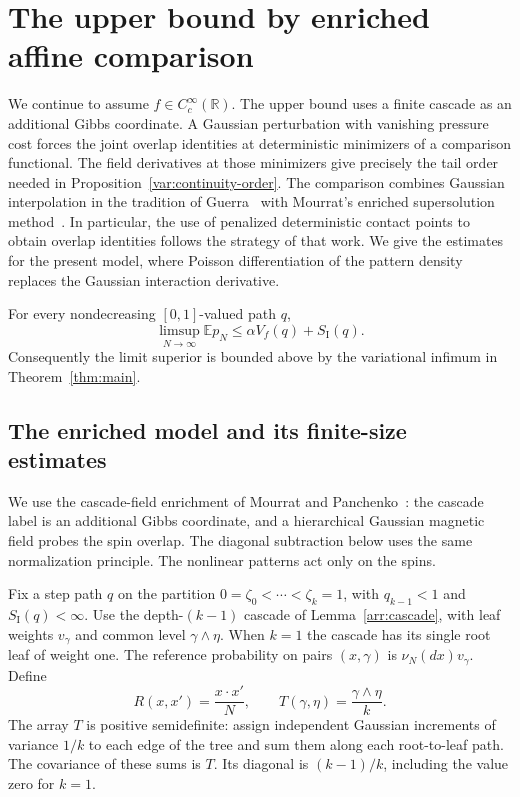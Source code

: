 \section{The upper bound by enriched affine comparison}
\label{upper:section}

We continue to assume $f\in C_c^\infty(\mathbb R)$. The upper
bound uses a finite cascade as an additional Gibbs coordinate.
A Gaussian perturbation with vanishing pressure cost forces the joint
overlap identities at deterministic minimizers of a comparison functional.
The field derivatives at those minimizers give precisely the tail
order needed in Proposition~\ref{var:continuity-order}.
The comparison combines Gaussian interpolation in the tradition of
Guerra~\cite{guerra2003} with Mourrat's enriched supersolution
method~\cite[Section~4]{mourrat2021}. In particular, the use of penalized
deterministic contact points to obtain overlap identities follows the
strategy of that work. We give the estimates for the present model,
where Poisson differentiation of the pattern density replaces the
Gaussian interaction derivative.

\begin{proposition}
\label{upper:bound}
For every nondecreasing $[0,1]$-valued path $q$,
\begin{equation}
\label{upper:conclusion}
 \limsup_{N\to\infty}\mathbb E p_N
 \le \alpha V_f(q)+S_{\mathrm I}(q).
\end{equation}
Consequently the limit superior is bounded above by the
variational infimum in Theorem~\ref{thm:main}.
\end{proposition}

\subsection{The enriched model and its finite-size estimates}

We use the cascade-field enrichment of Mourrat and
Panchenko~\cite{mourratpanchenko2020}: the cascade label is an additional
Gibbs coordinate, and a hierarchical Gaussian magnetic field probes the
spin overlap. The diagonal subtraction below uses the same normalization
principle. The nonlinear patterns act only on the spins.

Fix a step path $q$ on the partition
$0=\zeta_0<\cdots<\zeta_k=1$, with
$q_{k-1}<1$ and $S_{\mathrm I}(q)<\infty$.
Use the depth-$(k-1)$ cascade of Lemma~\ref{arr:cascade}, with
leaf weights $v_\gamma$ and common level $\gamma\wedge\eta$.
When $k=1$ the cascade has its single root leaf of weight one.
The reference probability on pairs $(x,\gamma)$ is
$\nu_N(dx)v_\gamma$. Define
\[
 R(x,x')=\frac{x\cdot x'}N,
 \qquad T(\gamma,\eta)=\frac{\gamma\wedge\eta}{k}.
\]
The array $T$ is positive semidefinite: assign independent
Gaussian increments of variance $1/k$ to each edge of the tree
and sum them along each root-to-leaf path. The covariance of
these sums is $T$. Its diagonal is $(k-1)/k$, including the
value zero for $k=1$.

